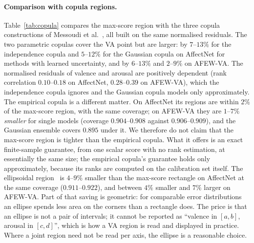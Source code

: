 \paragraph{Comparison with copula regions.}
\label{sec:copula}
Table~\ref{tab:copula} compares the max-score region with the three copula
constructions of Messoudi et al.~\cite{messoudi2021copula}, all built on the
same normalised residuals. The two parametric copulas cover the VA point but are
larger: by $7$--$13\%$ for the independence copula and $5$--$12\%$ for the
Gaussian copula on AffectNet for methods with learned uncertainty, and by
$6$--$13\%$ and $2$--$9\%$ on AFEW-VA. The normalised residuals of valence and
arousal are positively dependent (rank correlation $0.10$--$0.18$ on AffectNet,
$0.28$--$0.39$ on AFEW-VA), which the independence copula ignores and the
Gaussian copula models only approximately. The empirical copula is a different
matter. On AffectNet its regions are within $2\%$ of the max-score region, with
the same coverage; on AFEW-VA they are $1$--$7\%$ \emph{smaller} for single
models (coverage $0.904$--$0.908$ against $0.906$--$0.909$), and the Gaussian
ensemble covers $0.895$ under it. We therefore do not claim that the max-score
region is tighter than the empirical copula. What it offers is an exact
finite-sample guarantee, from one scalar score with no rank estimation, at
essentially the same size; the empirical copula's guarantee holds only
approximately, because its ranks are computed on the calibration set itself.
The ellipsoidal region~\cite{messoudi2022ellipsoidal} is $4$--$9\%$ smaller than
the max-score rectangle on AffectNet at the same coverage ($0.911$--$0.922$),
and between $4\%$ smaller and $7\%$ larger on AFEW-VA. Part of that saving is
geometric: for comparable error distributions an ellipse spends less area on
the corners than a rectangle does. The price is that an ellipse is not a pair of
intervals; it cannot be reported as ``valence in $[a,b]$, arousal in $[c,d]$'',
which is how a VA region is read and displayed in practice. Where a joint region
need not be read per axis, the ellipse is a reasonable choice.

\begin{table}[h]
  \centering\small
  \resizebox{\linewidth}{!}{}
  \caption{Max-score against copula regions on AffectNet (nominal $90\%$, mean
  over five seeds; ensembles combine the five seeds). All regions are
  rectangles on the same $\hat\sigma$-normalised residuals and differ only in
  how the two per-axis thresholds are chosen (Section~\ref{sec:method}), except
  the ellipsoid, a Mahalanobis region on the signed residuals. The
  AFEW-VA comparison is in the text and released with the code.}
  \label{tab:copula}
\end{table}

